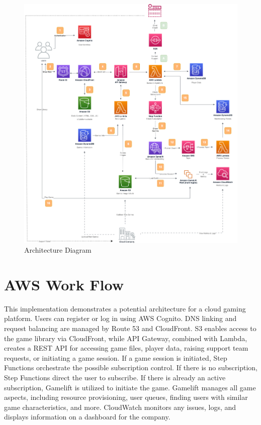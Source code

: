 \documentclass[a4paper,12pt]{report}
\begin{document}
\begin{figure}[H]
 \centering
\includegraphics[scale=0.35]{img/AWS_BPMN}
\caption{Architecture Diagram}
\label{AWS Architecture Diagram }
\end{figure} 
\section{AWS Work Flow}
This implementation demonstrates a potential architecture for a cloud gaming platform. Users can register or log in using AWS Cognito. DNS linking and request balancing are managed by Route 53 and CloudFront. S3 enables access to the game library via CloudFront, while API Gateway, combined with Lambda, creates a REST API for accessing game files, player data, raising support team requests, or initiating a game session. If a game session is initiated, Step Functions orchestrate the possible subscription control. If there is no subscription, Step Functions direct the user to subscribe. If there is already an active subscription, Gamelift is utilized to initiate the game. Gamelift manages all game aspects, including resource provisioning, user queues, finding users with similar game characteristics, and more. CloudWatch monitors any issues, logs, and displays information on a dashboard for the company.
\end{document}
